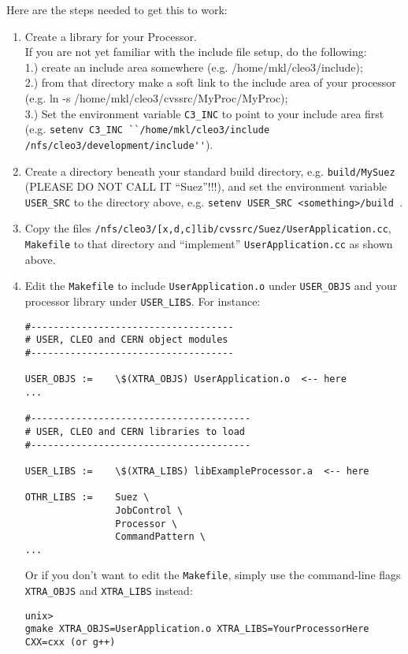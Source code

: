 \documentclass[12pt]{article}
\begin{document}
\noindent Here are the steps needed to get this to work:

\begin{enumerate}

\item Create a library for your Processor. \\ If you are not yet
familiar with the include file setup, do the following: \\1.) create an
include area somewhere (e.g. /home/mkl/cleo3/include); \\2.) from that
directory make a soft link to the include area of your processor
(e.g. ln -s /home/mkl/cleo3/cvssrc/MyProc/MyProc); \\3.) Set the
environment variable \verb=C3_INC= to point to your include area first
(e.g. \verb=setenv C3_INC ``/home/mkl/cleo3/include /nfs/cleo3/development/include''=).

\item Create a directory beneath your standard build directory,
e.g. \verb=build/MySuez= (PLEASE DO NOT CALL IT ``Suez''!!!), 
and set the environment variable \verb=USER_SRC=
to the directory above, e.g. \verb=setenv USER_SRC <something>/build =.

\item Copy the files
\verb=/nfs/cleo3/[x,d,c]lib/cvssrc/Suez/UserApplication.cc=, \verb=Makefile=
to that directory and ``implement'' \verb=UserApplication.cc= as shown
above.

\item Edit the \verb=Makefile= to include \verb=UserApplication.o= under \verb=USER_OBJS= and your processor library under
\verb=USER_LIBS=. For instance:
\begin{verbatim}
#------------------------------------
# USER, CLEO and CERN object modules
#------------------------------------

USER_OBJS :=    \$(XTRA_OBJS) UserApplication.o  <-- here
...

#---------------------------------------
# USER, CLEO and CERN libraries to load
#---------------------------------------

USER_LIBS :=    \$(XTRA_LIBS) libExampleProcessor.a  <-- here

OTHR_LIBS :=    Suez \
                JobControl \
                Processor \
                CommandPattern \
...
\end{verbatim}

Or if you don't want to edit the \verb=Makefile=, simply use the command-line
flags \verb=XTRA_OBJS= and \verb=XTRA_LIBS= instead:
\begin{verbatim}
unix> 
gmake XTRA_OBJS=UserApplication.o XTRA_LIBS=YourProcessorHere CXX=cxx (or g++)
\end{verbatim}

\end{enumerate}
\end{document}
